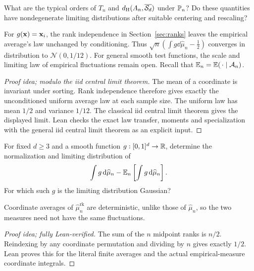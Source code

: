 \documentclass[11pt,letterpaper]{article}
\begin{document}
\begin{question}
      What are the typical orders of $T_n$ and $d_{\rm H}(A_n,\overline{\cS_d})$ under $\P_n$? Do these quantities have nondegenerate limiting distributions after suitable centering and rescaling?
\end{question}


For $g(\vx)=\vx_i$, the rank independence in Section~\ref{sec:ranks} leaves the empirical average's law unchanged by conditioning. Thus $\sqrt n(\int g\dd\widehat\mu_n-\frac12)$ converges in distribution to $\mathcal N(0,1/12)$. For general smooth test functions, the scale and limiting law of empirical fluctuations remain open. Recall that $\E_n=\E(\,\cdot\mid\cA_n)$.

\begin{proof}[Proof idea; modulo the iid central limit theorem]
The mean of a coordinate is invariant under sorting. Rank independence therefore gives exactly the unconditioned uniform average law at each sample size. The uniform law has mean $1/2$ and variance $1/12$. The classical iid central limit theorem gives the displayed limit. Lean checks the exact law transfer, moments and specialization with the general iid central limit theorem as an explicit input.
\end{proof}


\begin{question}
      For fixed $d\ge3$ and a smooth function $g:[0,1]^d\to\R$, determine the normalization and limiting distribution of
      \[
            \int g\dd\widehat\mu_n
            -\E_n\left[\int g\dd\widehat\mu_n\right].
      \]
      For which such $g$ is the limiting distribution Gaussian? \end{question}


Coordinate averages of $\widehat\mu_n^{\mathrm{rk}}$ are deterministic, unlike those of $\widehat\mu_n$, so the two measures need not have the same fluctuations.

\begin{proof}[Proof idea; fully Lean-verified]
The sum of the $n$ midpoint ranks is $n/2$. Reindexing by any coordinate permutation and dividing by $n$ gives exactly $1/2$. Lean proves this for the literal finite averages and the actual empirical-measure coordinate integrals.
\end{proof}
\end{document}
